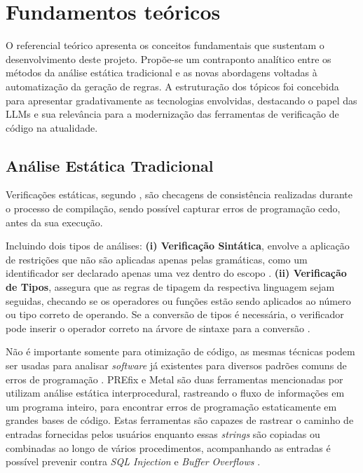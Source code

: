 \documentclass[
    12pt,                %
    openright,           %
    oneside,             %
    a4paper,             %
    english,             %
    brazil               %
]{abntex2}
\begin{document}
\section{Fundamentos teóricos}
\label{cap:referencial}
\par
O referencial teórico apresenta os conceitos fundamentais que sustentam o desenvolvimento deste projeto. 
Propõe-se um contraponto analítico entre os métodos da análise estática tradicional e as novas abordagens voltadas à automatização da geração de regras. 
A estruturação dos tópicos foi concebida para apresentar gradativamente as tecnologias envolvidas, destacando o papel das LLMs e sua relevância para a modernização das ferramentas de verificação de código na atualidade.

\subsection{Análise Estática Tradicional}
\label{sec:analisetradicional}
\par
Verificações estáticas, segundo , são checagens de consistência realizadas durante o processo de compilação, sendo possível capturar erros de programação cedo, antes da sua execução. 
\par
Incluindo dois tipos de análises: 
\textbf{(i) Verificação Sintática}, envolve a aplicação de restrições que não são aplicadas apenas pelas gramáticas, como um identificador ser declarado apenas uma vez dentro do escopo \cite{aho2007compilers}.
\textbf{(ii) Verificação de Tipos}, assegura que as regras de tipagem da respectiva linguagem sejam seguidas, checando se os operadores ou funções estão sendo aplicados ao número ou tipo correto de operando.
Se a conversão de tipos é necessária, o verificador pode inserir o operador correto na árvore de sintaxe para a conversão \cite{aho2007compilers}.
\par
Não é importante somente para otimização de código, as mesmas técnicas podem ser usadas para analisar \textit{software} já existentes para diversos padrões comuns de erros de programação \cite{aho2007compilers}.
PREfix e Metal são duas ferramentas mencionadas por  utilizam análise estática interprocedural, rastreando o fluxo de informações em um programa inteiro, para encontrar erros de programação estaticamente em grandes bases de código.
Estas ferramentas são capazes de rastrear o caminho de entradas fornecidas pelos usuários enquanto essas \textit{strings} são copiadas ou combinadas ao longo de vários procedimentos, acompanhando as entradas é possível prevenir contra \textit{SQL Injection} e \textit{Buffer Overflows} \cite{aho2007compilers}.
\end{document}
